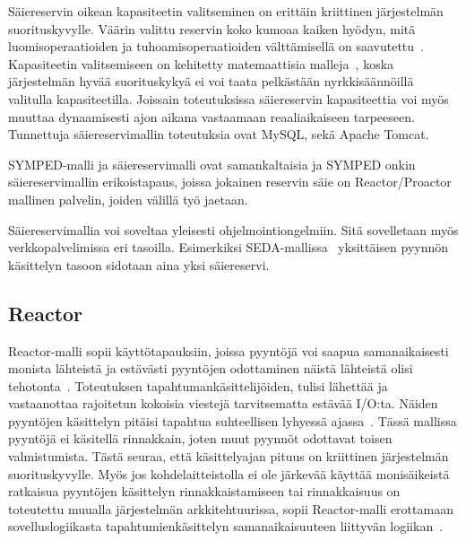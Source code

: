 \documentclass[finnish]{tktltiki2}%
\theoremstyle{definition}
\theoremstyle{remark}
\begin{document}
Säiereservin oikean kapasiteetin valitseminen on erittäin kriittinen
järjestelmän suorituskyvylle.
Väärin valittu reservin koko kumoaa kaiken hyödyn, mitä luomisoperaatioiden
ja tuhoamisoperaatioiden välttämisellä on saavutettu~\cite{ling_analysis_2000}.
Kapasiteetin valitsemiseen on kehitetty matemaattisia malleja~\cite{ling_analysis_2000},
koska järjestelmän hyvää suorituskykyä ei voi taata pelkästään nyrkkisäännöillä
valitulla kapasiteetilla.
Joissain toteutuksissa säiereservin kapasiteettia voi myös muuttaa dynaamisesti ajon aikana vastaamaan
reaaliaikaiseen tarpeeseen.
Tunnettuja säiereservimallin toteutuksia ovat MySQL, sekä Apache Tomcat.

SYMPED-malli ja säiereservimalli ovat samankaltaisia ja SYMPED onkin
säiereservimallin erikoistapaus, joissa jokainen reservin säie on
Reactor/Proactor mallinen palvelin,
joiden välillä työ jaetaan.

Säiereservimallia voi soveltaa yleisesti ohjelmointiongelmiin. Sitä
sovelletaan myös verkkopalvelimissa eri tasoilla. Esimerkiksi
SEDA-mallissa~\cite{welsh_seda_2001}
yksittäisen pyynnön käsittelyn tasoon sidotaan aina yksi säiereservi.

\subsection{Reactor}

Reactor-malli sopii käyttötapauksiin, joissa pyyntöjä voi saapua
samanaikaisesti monista lähteistä ja estävästi
pyyntöjen odottaminen näistä lähteistä olisi tehotonta~\cite{schmidt_reactor:_1995}.
Toteutuksen tapahtumankäsittelijöiden, tulisi
lähettää ja vastaanottaa rajoitetun kokoisia viestejä
tarvitsematta estävää I/O:ta.
Näiden pyyntöjen käsittelyn
pitäisi tapahtua suhteellisen lyhyessä ajassa~\cite{schmidt_reactor:_1995}.
Tässä mallissa pyyntöjä ei käsitellä rinnakkain, joten muut
pyynnöt odottavat toisen valmistumista.
Tästä seuraa, että käsittelyajan pituus on kriittinen järjestelmän
suorituskyvylle.
Myös jos kohdelaitteistolla ei ole järkevää käyttää monisäikeistä
ratkaisua pyyntöjen käsittelyn rinnakkaistamiseen tai rinnakkaisuus
on toteutettu muualla järjestelmän arkkitehtuurissa, sopii Reactor-malli
erottamaan sovelluslogiikasta tapahtumienkäsittelyn
samanaikaisuuteen liittyvän logiikan~\cite{schmidt_reactor:_1995}.
\end{document}
